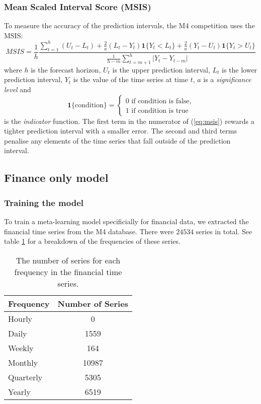 \documentclass[a4paper,12pt]{article}
\theoremstyle{definition}
\begin{document}
\subsubsection{Mean Scaled Interval Score (MSIS)}
To measure the accuracy of the prediction intervals, the M4 competition uses the MSIS:
\begin{equation}\label{eq:msis}
	MSIS = \frac{1}{h}\frac{\sum_{t=1}^h (U_t - L_t) +  \frac{2}{a}(L_t - Y_t)\mathbf{1}\lbrace Y_t < L_t \rbrace + \frac{2}{a}(Y_t - U_t)\mathbf{1}\lbrace Y_t > U_t \rbrace}{\frac{1}{h-m}\sum_{t=m+1}^h | Y_t - Y_{t-m} |}
\end{equation}
where $h$ is the forecast horizon, $U_t$ is the upper prediction interval, $L_t$ is the lower prediction interval, $Y_t$ is the value of the time series at time $t$, $a$ is a \textit{significance level} and
\begin{equation}
	\mathbf{1}\lbrace \text{condition} \rbrace =	\begin{cases}
								0 \text{ if condition is false,} \\
								1 \text{ if condition is true}
								\end{cases}
\end{equation}
is the \textit{indicator} function. The first term in the numerator of (\ref{eq:msis}) rewards a tighter prediction interval with a smaller error. The second and third terms penalise any elements of the time series that fall outside of the prediction interval.

\subsection{Finance only model}
\subsubsection{Training the model}
To train a meta-learning model specificially for financial data, we extracted the financial time series from the M4 database. There were $24534$ series in total. See table \ref{tab:frequency_breakdown} for a breakdown of the frequencies of these series.

\begin{table}\label{tab:frequency_breakdown}
  \centering
  \begin{tabular}{| l | c |}
    \hline
    \textbf{Frequency} & \textbf{Number of Series} \\ \hline
    Hourly & 0 \\ \hline
    Daily & 1559 \\ \hline
    Weekly & 164 \\ \hline
    Monthly & 10987 \\ \hline
    Quarterly & 5305 \\ \hline
    Yearly & 6519 \\ \hline
  \end{tabular}
  \caption{The number of series for each frequency in the financial time series.}
  \label{tab:frequency_breakdown}
\end{table}
\end{document}
